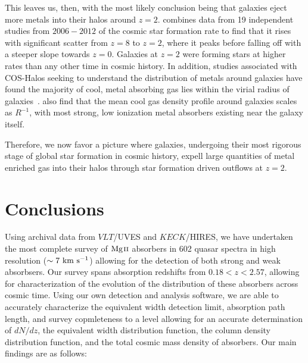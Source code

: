 \documentclass[iop,apj,numberedappendix,appendixfloats,twocolappendix]{emulateapj}
\begin{document}

This leaves us, then, with the most likely conclusion being that galaxies eject more metals into their halos around $z = 2$. \cite{Behroozi2013sfr} combines data from 19 independent studies from $2006-2012$ of the cosmic star formation rate to find that it rises with significant scatter from $z=8$ to $z=2$, where it peaks before falling off with a steeper slope towards $z = 0$. Galaxies at $z=2$ were forming stars at higher rates than any other time in cosmic history. In addition, studies associated with COS-Halos seeking to understand the distribution of metals around galaxies have found the majority of cool, metal absorbing gas lies within the virial radius of galaxies~\citep{Peeples2014}. \cite{Stern2016} also find that the mean cool gas density profile around galaxies scales as $R^{-1}$, with most strong, low ionization metal absorbers existing near the galaxy itself. 

Therefore, we now favor a picture where galaxies, undergoing their most rigorous stage of global star formation in cosmic history, expell large quantities of metal enriched gas into their halos through star formation driven outflows at $z = 2$. 


\section{Conclusions}
\label{sec:conclusions}

Using archival data from $VLT$/UVES and $KECK$/HIRES, we have undertaken the most complete survey of ${\hbox{{\rm Mg}\kern 0.1em{\sc ii}}}$ absorbers in 602 quasar spectra in high resolution ($\sim 7~\mathrm{\hbox{km~s$^{-1}$}}$) allowing for the detection of both strong and weak {\MgII} absorbsers. Our survey spans absorption redshifts from $0.18 < z < 2.57$, allowing for characterization of the evolution of the distribution of these absorbers across cosmic time. Using our own detection and analysis software, we are able to accurately characterize the equivalent width detection limit, absorption path length, and survey copmleteness to a level allowing for an accurate determination of $dN\!/dz$, the equivalent width distribution function, the column density distribution function, and the total cosmic mass density of {\MgII} absorbers. Our main findings are as follows:
\end{document}
